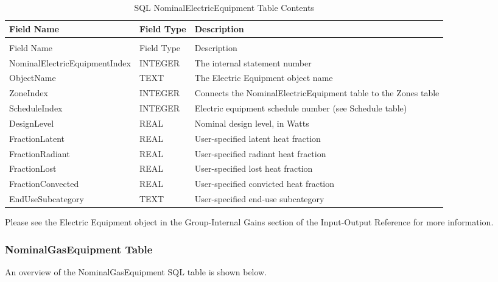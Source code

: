\begin{longtable}[c]{p{1.5in}p{1.5in}p{2.99in}}
\caption{SQL NominalElectricEquipment Table Contents \label{table:table-17.-sql-nominalelectricequipment-table}} \tabularnewline
\toprule 
Field Name & Field Type & Description \tabularnewline
\midrule
\endfirsthead

\caption[]{SQL NominalElectricEquipment Table Contents} \tabularnewline
\toprule 
Field Name & Field Type & Description \tabularnewline
\midrule
\endhead

NominalElectricEquipmentIndex & INTEGER & The internal statement number \tabularnewline
ObjectName & TEXT & The Electric Equipment object name \tabularnewline
ZoneIndex & INTEGER & Connects the NominalElectricEquipment table to the Zones table \tabularnewline
ScheduleIndex & INTEGER & Electric equipment schedule number (see Schedule table) \tabularnewline
DesignLevel & REAL & Nominal design level, in Watts \tabularnewline
FractionLatent & REAL & User-specified latent heat fraction \tabularnewline
FractionRadiant & REAL & User-specified radiant heat fraction \tabularnewline
FractionLost & REAL & User-specified lost heat fraction \tabularnewline
FractionConvected & REAL & User-specified convicted heat fraction \tabularnewline
EndUseSubcategory & TEXT & User-specified end-use subcategory \tabularnewline
\bottomrule
\end{longtable}

Please see the Electric Equipment object in the Group-Internal Gains section of the Input-Output Reference for more information.

\subsubsection{NominalGasEquipment Table}

An overview of the NominalGasEquipment SQL table is shown below.

